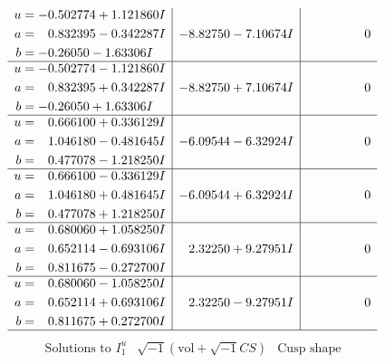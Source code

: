 \documentclass[1p]{elsarticle_modified}
\theoremstyle{definition}
\newcommand{\I}{\sqrt{-1}}
\begin{document}
$$\begin{array}{c|c|c}
\begin{aligned}
u &= -0.502774 + 1.121860 I \\
a &= \phantom{-}0.832395 - 0.342287 I \\
b &= -0.26050 - 1.63306 I\end{aligned}
 & -8.82750 - 7.10674 I & \phantom{-0.000000 } 0 \\ \hline\begin{aligned}
u &= -0.502774 - 1.121860 I \\
a &= \phantom{-}0.832395 + 0.342287 I \\
b &= -0.26050 + 1.63306 I\end{aligned}
 & -8.82750 + 7.10674 I & \phantom{-0.000000 } 0 \\ \hline\begin{aligned}
u &= \phantom{-}0.666100 + 0.336129 I \\
a &= \phantom{-}1.046180 - 0.481645 I \\
b &= \phantom{-}0.477078 - 1.218250 I\end{aligned}
 & -6.09544 - 6.32924 I & \phantom{-0.000000 } 0 \\ \hline\begin{aligned}
u &= \phantom{-}0.666100 - 0.336129 I \\
a &= \phantom{-}1.046180 + 0.481645 I \\
b &= \phantom{-}0.477078 + 1.218250 I\end{aligned}
 & -6.09544 + 6.32924 I & \phantom{-0.000000 } 0 \\ \hline\begin{aligned}
u &= \phantom{-}0.680060 + 1.058250 I \\
a &= \phantom{-}0.652114 - 0.693106 I \\
b &= \phantom{-}0.811675 - 0.272700 I\end{aligned}
 & \phantom{-}2.32250 + 9.27951 I & \phantom{-0.000000 } 0 \\ \hline\begin{aligned}
u &= \phantom{-}0.680060 - 1.058250 I \\
a &= \phantom{-}0.652114 + 0.693106 I \\
b &= \phantom{-}0.811675 + 0.272700 I\end{aligned}
 & \phantom{-}2.32250 - 9.27951 I & \phantom{-0.000000 } 0\\
 \hline 
 \end{array}$$\newpage$$\begin{array}{c|c|c}  
\text{Solutions to }I^u_{1}& \I (\text{vol} + \sqrt{-1}CS) & \text{Cusp shape}\\

\end{array}$$
\end{document}
